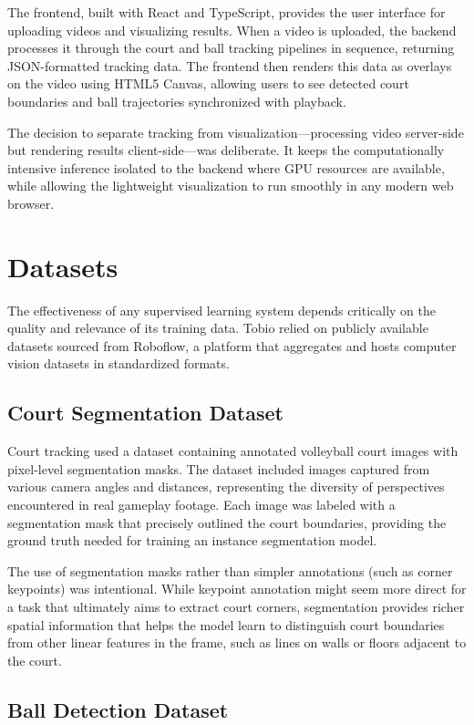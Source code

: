 The frontend, built with React and TypeScript, provides the user interface for uploading videos and visualizing results. When a video is uploaded, the backend processes it through the court and ball tracking pipelines in sequence, returning JSON-formatted tracking data. The frontend then renders this data as overlays on the video using HTML5 Canvas, allowing users to see detected court boundaries and ball trajectories synchronized with playback.

The decision to separate tracking from visualization—processing video server-side but rendering results client-side—was deliberate. It keeps the computationally intensive inference isolated to the backend where GPU resources are available, while allowing the lightweight visualization to run smoothly in any modern web browser.

\section{Datasets}

The effectiveness of any supervised learning system depends critically on the quality and relevance of its training data. Tobio relied on publicly available datasets sourced from Roboflow, a platform that aggregates and hosts computer vision datasets in standardized formats.

\subsection{Court Segmentation Dataset}

Court tracking used a dataset containing annotated volleyball court images with pixel-level segmentation masks. The dataset included images captured from various camera angles and distances, representing the diversity of perspectives encountered in real gameplay footage. Each image was labeled with a segmentation mask that precisely outlined the court boundaries, providing the ground truth needed for training an instance segmentation model.

The use of segmentation masks rather than simpler annotations (such as corner keypoints) was intentional. While keypoint annotation might seem more direct for a task that ultimately aims to extract court corners, segmentation provides richer spatial information that helps the model learn to distinguish court boundaries from other linear features in the frame, such as lines on walls or floors adjacent to the court.

\subsection{Ball Detection Dataset}

